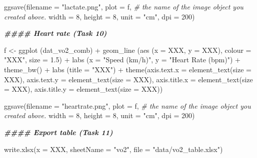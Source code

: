 \documentclass[
]{book}
\newenvironment{Shaded}{\begin{snugshade}}{\end{snugshade}}
\newcommand{\AttributeTok}[1]{\textcolor[rgb]{0.77,0.63,0.00}{#1}}
\newcommand{\CommentTok}[1]{\textcolor[rgb]{0.56,0.35,0.01}{\textit{#1}}}
\newcommand{\DecValTok}[1]{\textcolor[rgb]{0.00,0.00,0.81}{#1}}
\newcommand{\DocumentationTok}[1]{\textcolor[rgb]{0.56,0.35,0.01}{\textbf{\textit{#1}}}}
\newcommand{\FloatTok}[1]{\textcolor[rgb]{0.00,0.00,0.81}{#1}}
\newcommand{\FunctionTok}[1]{\textcolor[rgb]{0.00,0.00,0.00}{#1}}
\newcommand{\NormalTok}[1]{#1}
\newcommand{\OtherTok}[1]{\textcolor[rgb]{0.56,0.35,0.01}{#1}}
\newcommand{\SpecialCharTok}[1]{\textcolor[rgb]{0.00,0.00,0.00}{#1}}
\newcommand{\StringTok}[1]{\textcolor[rgb]{0.31,0.60,0.02}{#1}}
\begin{document}
\begin{Shaded}
\begin{Highlighting}[]
\FunctionTok{ggsave}\NormalTok{(}\AttributeTok{filename =} \StringTok{"lactate.png"}\NormalTok{, }
       \AttributeTok{plot =}\NormalTok{ f, }\CommentTok{\# the name of the image object you created above.}
       \AttributeTok{width =} \DecValTok{8}\NormalTok{, }
       \AttributeTok{height =} \DecValTok{8}\NormalTok{, }
       \AttributeTok{unit =} \StringTok{"cm"}\NormalTok{, }
       \AttributeTok{dpi =} \DecValTok{200}\NormalTok{)}

\DocumentationTok{\#\#\#\# Heart rate (Task 10)}

\NormalTok{f }\OtherTok{\textless{}{-}} \FunctionTok{ggplot}\NormalTok{ (dat\_vo2\_comb) }\SpecialCharTok{+}
  \FunctionTok{geom\_line}\NormalTok{ (}\FunctionTok{aes}\NormalTok{ (}\AttributeTok{x =}\NormalTok{ XXX, }\AttributeTok{y =}\NormalTok{ XXX), }\AttributeTok{colour =} \StringTok{"XXX"}\NormalTok{, }\AttributeTok{size =} \FloatTok{1.5}\NormalTok{) }\SpecialCharTok{+} 
  \FunctionTok{labs}\NormalTok{ (}\AttributeTok{x =} \StringTok{"Speed (km/h)"}\NormalTok{,}
        \AttributeTok{y =} \StringTok{"Heart Rate (bpm)"}\NormalTok{) }\SpecialCharTok{+}
  \FunctionTok{theme\_bw}\NormalTok{() }\SpecialCharTok{+} 
  \FunctionTok{labs}\NormalTok{ (}\AttributeTok{title =} \StringTok{"XXX"}\NormalTok{) }\SpecialCharTok{+} 
  \FunctionTok{theme}\NormalTok{(}\AttributeTok{axis.text.x =} \FunctionTok{element\_text}\NormalTok{(}\AttributeTok{size =}\NormalTok{ XXX),}
        \AttributeTok{axis.text.y =} \FunctionTok{element\_text}\NormalTok{(}\AttributeTok{size =}\NormalTok{ XXX),  }
        \AttributeTok{axis.title.x =} \FunctionTok{element\_text}\NormalTok{(}\AttributeTok{size =}\NormalTok{ XXX),}
        \AttributeTok{axis.title.y =} \FunctionTok{element\_text}\NormalTok{(}\AttributeTok{size =}\NormalTok{ XXX))}

\FunctionTok{ggsave}\NormalTok{(}\AttributeTok{filename =} \StringTok{"heartrate.png"}\NormalTok{, }
       \AttributeTok{plot =}\NormalTok{ f, }\CommentTok{\# the name of the image object you created above.}
       \AttributeTok{width =} \DecValTok{8}\NormalTok{, }
       \AttributeTok{height =} \DecValTok{8}\NormalTok{, }
       \AttributeTok{unit =} \StringTok{"cm"}\NormalTok{, }
       \AttributeTok{dpi =} \DecValTok{200}\NormalTok{)}

\DocumentationTok{\#\#\#\# Export table (Task 11)}

\FunctionTok{write.xlsx}\NormalTok{(}\AttributeTok{x =}\NormalTok{ XXX,}
           \AttributeTok{sheetName =} \StringTok{"vo2"}\NormalTok{,}
           \AttributeTok{file =} \StringTok{"data/vo2\_table.xlsx"}\NormalTok{)}


\end{Highlighting}
\end{Shaded}
\end{document}

